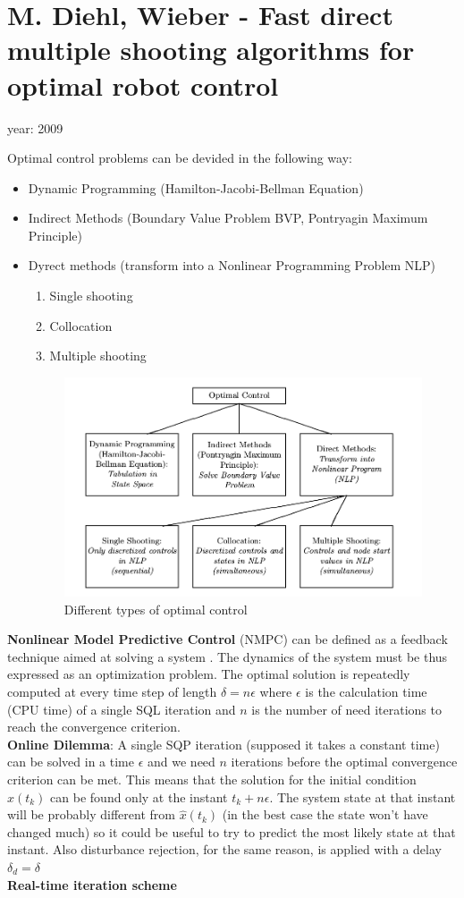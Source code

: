 \section{M. Diehl, Wieber - Fast direct multiple shooting algorithms for optimal robot control \cite{DiehlWieber}}
year: 2009

Optimal control problems can be devided in the following way:
\begin{itemize}
\item Dynamic Programming (Hamilton-Jacobi-Bellman Equation)
\item Indirect Methods (Boundary Value Problem BVP, Pontryagin Maximum Principle)
\item Dyrect methods (transform into a Nonlinear Programming Problem NLP)
\begin{enumerate}
\item Single shooting
\item Collocation
\item Multiple shooting
\end{enumerate}
\begin{figure}[h]
  \centering
  \includegraphics[width=120mm]{OptimizationDiehl}
  \caption{Different types of optimal control}
  \label{OptimizationDiehl}
\end{figure}
\end{itemize}
\textbf{Nonlinear Model Predictive Control} (NMPC) can be defined as a feedback technique aimed at solving a system . The dynamics of the system must be thus expressed as an optimization problem. The optimal solution is repeatedly computed at every time step of length $\delta = n \epsilon$ where $\epsilon$ is the calculation time (CPU time) of a single SQL iteration and $n$ is the number of need iterations to reach the convergence criterion.\\
\textbf{Online Dilemma}: A single SQP iteration (supposed it takes a constant time) can be solved in a time $\epsilon$ and we need $n$ iterations before the optimal convergence criterion can be met. This means that the solution for the initial condition $\hat{x}(t_k)$ can be found only at the instant $t_k + n \epsilon $. The system state at that instant will be probably different from $\hat{x}(t_k)$ (in the best case the state won't have changed much) so it could be useful to try to predict the most likely state at that instant. Also disturbance rejection, for the same reason, is applied with a delay $\delta_d = \delta$\\
\textbf{Real-time iteration scheme}